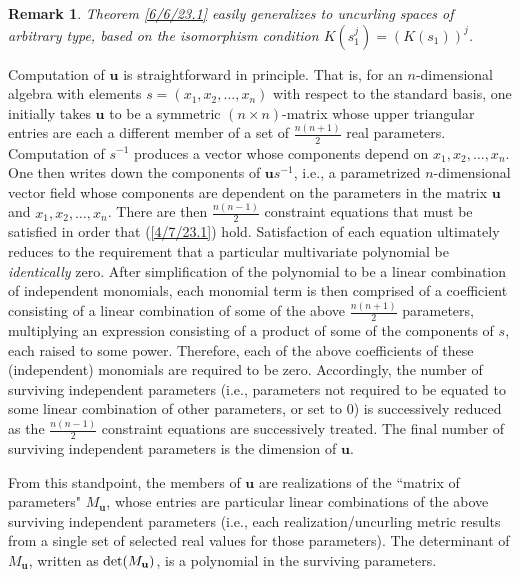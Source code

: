 \documentclass{amsart}
\numberwithin{equation}{section}
\newtheorem{remark}[theorem]{Remark}
\theoremstyle{definition}
\numberwithin{theorem}{section}
\begin{document}
\begin{remark} \label{9/18/23.1} {\rm Theorem \ref{6/6/23.1} easily generalizes to uncurling spaces of arbitrary type, based on the isomorphism condition $K(s_1^j) = (K(s_1))^j$.   } \end{remark}

Computation of $\mathbf{u}$ is straightforward in principle.  That is, for an $n$-dimensional algebra with elements $s = (x_1,x_2,\dots,x_n)$ with respect to the standard basis, one initially takes $\mathbf{u}$ to be a symmetric $(n\times n)$-matrix  whose upper triangular entries are each a different member of a set of $\frac{n(n+1)}{2}$ real parameters.  Computation of $s^{-1}$ produces a vector whose components depend on $x_1,x_2,\dots,x_n$.  One then writes down the components of $\mathbf{u}s^{-1}$, i.e., a parametrized $n$-dimensional vector field whose components are dependent on the parameters in the matrix $\mathbf{u}$ and $x_1,x_2,\dots,x_n$.  There are then $\frac{n(n-1)}{2}$ constraint equations that must be satisfied in order that (\ref{4/7/23.1}) hold.  Satisfaction of each equation ultimately reduces to the requirement that a particular multivariate polynomial be {\it identically} zero.  After simplification of the polynomial to be a linear combination of independent monomials, each monomial term is then comprised of a coefficient consisting of a linear combination of some of the above $\frac{n(n+1)}{2}$ parameters, multiplying an expression consisting of a product of some of the components of $s$, each raised to some power.  Therefore, each of the above coefficients of these (independent) monomials are required to be zero.  Accordingly, the number of surviving independent parameters (i.e., parameters not required to be equated to some linear combination of other parameters, or set to 0) is successively reduced as the $\frac{n(n-1)}{2}$ constraint equations are successively treated.  The final number of surviving independent parameters is the dimension of $\mathbf{u}$.

From this standpoint, the members of $\mathbf{u}$ are realizations of the ``matrix of parameters" $M_{\mathbf{u}}$, whose entries are particular linear combinations of the above surviving independent parameters (i.e., each realization/uncurling metric results from a single set of selected real values for those parameters).  The determinant of $M_{\mathbf{u}}$, written as ${\rm det}(M_{\mathbf{u}})$, is a polynomial in the surviving parameters.  
\end{document}
